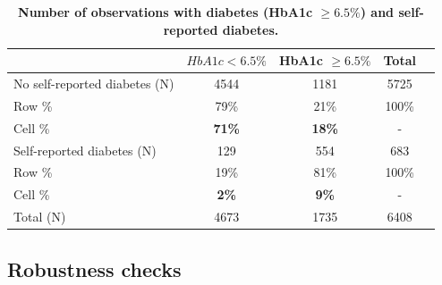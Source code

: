 \documentclass[12pt,english]{article}
\providecommand{\DIFaddtex}[1]{{\protect\color{blue}#1}} %
\providecommand{\DIFaddbegin}{} %
\providecommand{\DIFadd}[1]{\texorpdfstring{\DIFaddtex{#1}}{#1}} %
\begin{document}
\clearpage

\begin{table}[!ht]
	\caption{\label{tab:Biomarker_observations}{\bf Number of observations with diabetes (HbA1c $\geq 6.5\%$) and self-reported diabetes.}}
	\begin{center}
		\begin{adjustbox}{max width=\linewidth}
			\begin{threeparttable}
				{
					\def\sym#1{\ifmmode^{#1}\else\(^{#1}\)\fi}
					\begin{tabular}{lcccc}
						\toprule
						&\multicolumn{1}{c}{$HbA1c < 6.5\%$}&\multicolumn{1}{c}{HbA1c $\geq 6.5\%$}&\multicolumn{1}{c}{Total}\\
						\midrule
						No self-reported diabetes (N) & 4544 & 1181 & 5725 &  \\
						\hspace*{10mm}Row  \% & 79\% & 21\% & 100\% &  \\
						\hspace*{10mm}Cell \% & \textbf{71\%} & \textbf{18\%} & - & \\
						Self-reported diabetes (N) & 129 & 554 & 683 &  \\
						\hspace*{10mm}Row \%  & 19\% & 81\% & 100\% &  \\
						\hspace*{10mm}Cell \% & \textbf{2\%} &\textbf{9\%} &- & \\
						Total (N) & 4673 & 1735 & 6408 &  \\ 
						\bottomrule
					\end{tabular}
					\begin{tablenotes}
						\item
					\end{tablenotes}
				}
			\end{threeparttable}
		\end{adjustbox}
	\end{center}
\end{table}


\clearpage
\DIFaddbegin 

\subsection*{\DIFadd{Robustness checks}}
\end{document}
